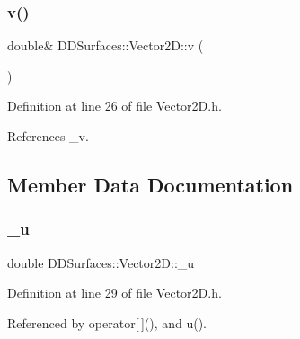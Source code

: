 \hypertarget{class_d_d_surfaces_1_1_vector2_d_aff280a5b8f8a363199965bc609a02ee0}{}\label{class_d_d_surfaces_1_1_vector2_d_aff280a5b8f8a363199965bc609a02ee0} 
\subsubsection{\texorpdfstring{v()}{v()}\hspace{0.1cm}{\footnotesize\ttfamily [2/2]}}
{\footnotesize\ttfamily double\& D\+D\+Surfaces\+::\+Vector2\+D\+::v (\begin{DoxyParamCaption}{ }\end{DoxyParamCaption})\hspace{0.3cm}{\ttfamily [inline]}}



Definition at line 26 of file Vector2\+D.\+h.



References \+\_\+v.



\subsection{Member Data Documentation}
\hypertarget{class_d_d_surfaces_1_1_vector2_d_a168e75ab549555cd365ce3e3e3a48093}{}\label{class_d_d_surfaces_1_1_vector2_d_a168e75ab549555cd365ce3e3e3a48093} 
\subsubsection{\texorpdfstring{\+\_\+u}{\_u}}
{\footnotesize\ttfamily double D\+D\+Surfaces\+::\+Vector2\+D\+::\+\_\+u\hspace{0.3cm}{\ttfamily [private]}}



Definition at line 29 of file Vector2\+D.\+h.



Referenced by operator\mbox{[}$\,$\mbox{]}(), and u().

\hypertarget{class_d_d_surfaces_1_1_vector2_d_ac52fd163a951a5a29978eb8dad3fc07e}{}\label{class_d_d_surfaces_1_1_vector2_d_ac52fd163a951a5a29978eb8dad3fc07e} 
